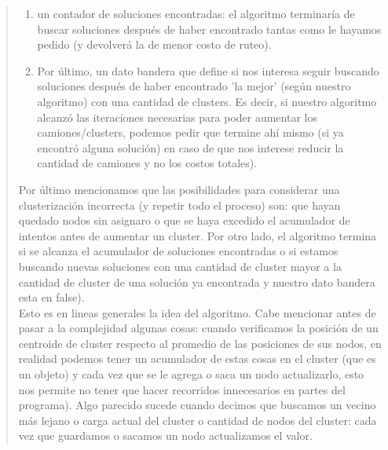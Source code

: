 \documentclass[11pt,a4paper]{article}
\begin{document}
\begin{verse}
\begin{enumerate}[label=(\roman*)]
\item un contador de soluciones encontradas: el algoritmo terminaría de buscar soluciones después de haber encontrado tantas como le hayamos pedido (y devolverá la de menor costo de ruteo).

\item Por último, un dato bandera que define si nos interesa seguir buscando soluciones después de haber encontrado 'la mejor' (según nuestro algoritmo) con una cantidad de clusters. Es decir, si nuestro algoritmo alcanzó las iteraciones necesarias para poder aumentar los camiones/clusters, podemos pedir que termine ahí mismo (si ya encontró alguna solución) en caso de que nos interese reducir la cantidad de camiones y no los costos totales).\\
\end{enumerate}
Por último mencionamos que las posibilidades para considerar una clusterización incorrecta (y repetir todo el proceso) son: que hayan quedado nodos sin asignaro o que se haya excedido el acumulador de intentos antes de aumentar un cluster. Por otro lado, el algoritmo termina si se alcanza el acumulador de soluciones encontradas o si estamos buscando nuevas soluciones con una cantidad de cluster mayor a la cantidad de cluster de una solución ya encontrada y nuestro dato bandera esta en false).\\
Esto es en lineas generales la idea del algoritmo. Cabe mencionar antes de pasar a la complejidad algunas cosas: cuando verificamos la posición de un centroide de cluster respecto al promedio de las posiciones de sus nodos, en realidad podemos tener un acumulador de estas cosas en el cluster (que es un objeto) y cada vez que se le agrega o saca un nodo actualizarlo, esto nos permite no tener que hacer recorridos innecesarios en partes del programa). Algo parecido sucede cuando decimos que buscamos un vecino más lejano o carga actual del cluster o cantidad de nodos del cluster: cada vez que guardamos o sacamos un nodo actualizamos el valor. \\


\end{verse}
\end{document}
